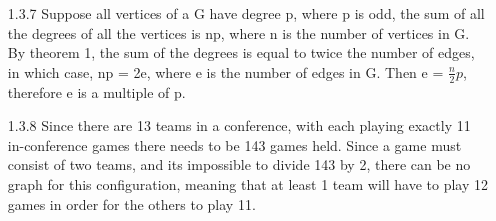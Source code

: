 \documentclass{article}
\begin{document}
\begin{enumerate}
\item[1.3.7]
Suppose all vertices of a G have degree p, where p is odd, the sum of all the degrees of all the vertices is np, where n is the number of vertices in G. By theorem 1, the sum of the degrees is equal to twice the number of edges, in which case, np = 2e, where e is the number of edges in G. Then e = $\frac{n}{2}p$, therefore e is a multiple of p. 
\item[1.3.8]
Since there are 13 teams in a conference, with each playing exactly 11
in-conference games there needs to be 143 games held. Since a game must consist
of two teams, and its impossible to divide 143 by 2, there can be no graph for
this configuration, meaning that at least 1 team will have to play 12 games in
order for the others to play 11. 
\end{enumerate}
\end{document}
